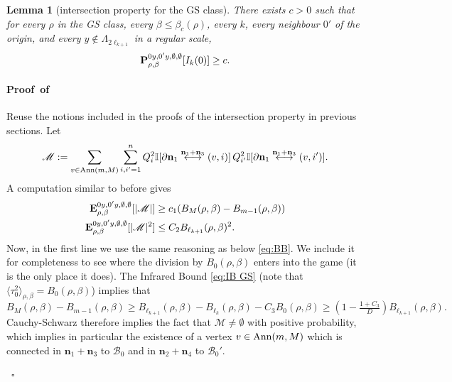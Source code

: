 \documentclass[a4paper,oneside,11pt]{article}
\newtheorem{lemma}[theorem]{Lemma}
\newcommand{\be}[1]{\begin{equation}\label{#1}}
\newcommand{\ee}{\end{equation}}
\numberwithin{equation}{section}
\numberwithin{equation}{section}
\numberwithin{equation}{section}
\newenvironment{proof}[1][\relax]%
  {\paragraph{Proof\ifx#1\relax\else~of #1\fi}}%
  {~\hfill$\square$\par\bigskip}
\newcommand{\calB}{\mathcal{B}}
\newcommand{\calM}{\mathcal{M}}
\def\be{\begin{equation}}
\def\ee{\end{equation}}
\newcommand{\n}{\mathbf{n}}
\begin{document}
\begin{lemma}[intersection property for the GS class]\label{lem:intersection phi4}
There exists $c>0$ such that for every $\rho$ in the GS class, every $\beta\le\beta_c(\rho)$, every $k$, every neighbour $0'$ of the origin, and every $y\notin \Lambda_{2\ell_{k+1}}$ in a regular scale,
\be
{\bf P}^{0y,0'y,\emptyset,\emptyset}_{\rho,\beta}[I_k(0)]\ge c.
\ee
\end{lemma}
\begin{proof}
Reuse the notions included in the proofs of the intersection property in previous sections. Let 
\be
\calM:=\sum_{v\in {\rm Ann}(m,M)} \sum_{i,i'=1}^n Q_i^2\mathbb I[\partial\n_1\stackrel{\n_1+\n_3}{\longleftrightarrow}(v,i)]\,Q_{i'}^2\mathbb I[\partial\n_1\stackrel{\n_1+\n_3}{\longleftrightarrow}(v,i')].
\ee
A computation similar to before gives
\begin{align}
{\bf E}^{0y,0'y,\emptyset,\emptyset}_{\rho,\beta}[|\calM|]&\ge c_1(B_{M}(\rho,\beta)-B_{m-1}(\rho,\beta))\\
{\bf E}^{0y,0'y,\emptyset,\emptyset}_{\rho,\beta}[|\calM|^2]&\le C_2B_{\ell_{k+1}}(\rho,\beta)^2.
\end{align}
Now, in the first line we use the same reasoning as below \eqref{eq:BB}. We include it for completeness to see where the division by $B_0(\rho,\beta)$ enters into the game (it is the only place it does). The Infrared Bound \eqref{eq:IB GS} (note that $\langle\tau_0^2\rangle_{\rho,\beta}=B_0(\rho,\beta)$) implies that 
\be
B_{M}(\rho,\beta)-B_{m-1}(\rho,\beta)\ge B_{\ell_{k+1}}(\rho,\beta)-B_{\ell_k}(\rho,\beta)-C_3B_0(\rho,\beta)\ge (1-\tfrac{1+C_3}D)B_{\ell_{k+1}}(\rho,\beta).
\ee
Cauchy-Schwarz therefore implies the fact that $\calM\ne \emptyset$ with positive probability, which implies in particular the existence of a vertex $v\in{\rm Ann}(m,M)$ which is connected in $\n_1+\n_3$ to $\calB_0$ and in $\n_2+\n_4$ to $\calB_0'$.


\end{proof}
\end{document}
